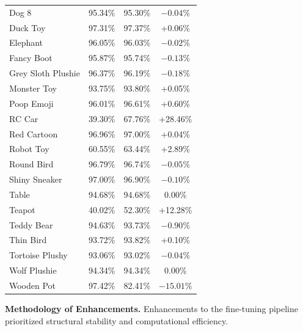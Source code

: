 \documentclass[journal,12pt,onecolumn,draftclsnofoot]{IEEEtran}
\begin{document}
\begin{longtable}{l c c c}
Dog 8 & 95.34\% & 95.30\% & $-0.04\%$ \\
Duck Toy & 97.31\% & 97.37\% & +0.06\% \\
Elephant & 96.05\% & 96.03\% & $-0.02\%$ \\
Fancy Boot & 95.87\% & 95.74\% & $-0.13\%$ \\
Grey Sloth Plushie & 96.37\% & 96.19\% & $-0.18\%$ \\
Monster Toy & 93.75\% & 93.80\% & +0.05\% \\
Poop Emoji & 96.01\% & 96.61\% & +0.60\% \\
RC Car & 39.30\% & 67.76\% & +28.46\% \\
Red Cartoon & 96.96\% & 97.00\% & +0.04\% \\
Robot Toy & 60.55\% & 63.44\% & +2.89\% \\
Round Bird & 96.79\% & 96.74\% & $-0.05\%$ \\
Shiny Sneaker & 97.00\% & 96.90\% & $-0.10\%$ \\
Table & 94.68\% & 94.68\% & 0.00\% \\
Teapot & 40.02\% & 52.30\% & +12.28\% \\
Teddy Bear & 94.63\% & 93.73\% & $-0.90\%$ \\
Thin Bird & 93.72\% & 93.82\% & +0.10\% \\
Tortoise Plushy & 93.06\% & 93.02\% & $-0.04\%$ \\
Wolf Plushie & 94.34\% & 94.34\% & 0.00\% \\
Wooden Pot & 97.42\% & 82.41\% & $-15.01\%$ \\
\end{longtable}
\normalsize

\textbf{Methodology of Enhancements.} Enhancements to the fine-tuning pipeline prioritized structural stability and computational efficiency.

\begin{table}[htbp]
\centering
\caption{Enhancements Activated in the PerSeg PerSAM-F Experiment}
\label{tab:enh_persamf_active}
\renewcommand{\arraystretch}{1.4}
\end{table}
\end{document}
